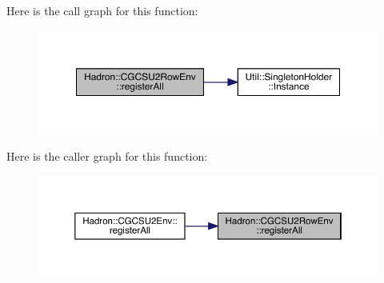 Here is the call graph for this function\+:\nopagebreak
\begin{figure}[H]
\begin{center}
\leavevmode
\includegraphics[width=350pt]{d6/dea/namespaceHadron_1_1CGCSU2RowEnv_a613b8fd4057061e97fd9c03d53dfc4e8_cgraph}
\end{center}
\end{figure}
Here is the caller graph for this function\+:\nopagebreak
\begin{figure}[H]
\begin{center}
\leavevmode
\includegraphics[width=350pt]{d6/dea/namespaceHadron_1_1CGCSU2RowEnv_a613b8fd4057061e97fd9c03d53dfc4e8_icgraph}
\end{center}
\end{figure}
